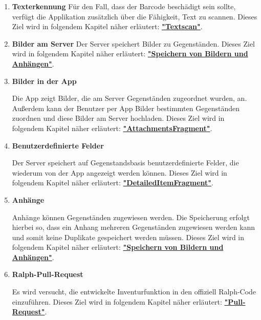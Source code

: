 \documentclass[
    headings=optiontotocandhead,%
    twoside,
    numbers=noenddot,%
    toc=flat, %
    12pt, %
    titlepage, %
    parskip=full, %
    listof=totoc, %
    listof=flat, %
    numbers=noenddot, %
    bibliography=totoc, %
    a4paper,DIV=14,
    BCOR=15mm,
]{scrbook}
\begin{document}
\begin{enumerate}
  \item \textbf{Texterkennung}
  Für den Fall, dass der Barcode beschädigt sein sollte, verfügt die Applikation zusätzlich über die Fähigkeit, Text zu scannen.  
  Dieses Ziel wird in folgendem Kapitel näher erläutert: \textbf{\href{textscan}{"Textscan"}}.




  \item \textbf{Bilder am Server}
  Der Server speichert Bilder zu Gegenständen.  
  Dieses Ziel wird in folgendem Kapitel näher erläutert: \textbf{\href{speichern-von-bildern-und-anhuxe4ngen}{"Speichern von Bildern und Anhängen"}}.



  \item \textbf{Bilder in der App}

  Die App zeigt Bilder, die am Server Gegenständen zugeordnet wurden, an. Außerdem kann der Benutzer per App Bilder bestimmten Gegenständen zuordnen und diese Bilder am Server hochladen.
  Dieses Ziel wird in folgendem Kapitel näher erläutert: \textbf{\href{attachmentsfragment}{"AttachmentsFragment"}}.




  \item \textbf{Benutzerdefinierte Felder}

  Der Server speichert auf Gegenstandsbasis benutzerdefinierte Felder, die wiederum von der App angezeigt werden können.
  Dieses Ziel wird in folgendem Kapitel näher erläutert: \textbf{\href{detaileditemfragment}{"DetailedItemFragment"}}.



  \item \textbf{Anhänge}

  Anhänge können Gegenständen zugewiesen werden. Die Speicherung erfolgt hierbei so, dass ein Anhang mehreren Gegenständen zugewiesen werden kann und somit keine Duplikate gespeichert werden müssen.
  Dieses Ziel wird in folgendem Kapitel näher erläutert: \textbf{\href{speichern-von-bildern-und-anhuxe4ngen}{"Speichern von Bildern und Anhängen"}}.



  \item \textbf{Ralph-Pull-Request}

  Es wird versucht, die entwickelte Inventurfunktion in den offiziell Ralph-Code einzuführen. 
  Dieses Ziel wird in folgendem Kapitel näher erläutert: \textbf{\href{pull-request}{"Pull-Request"}}.




\end{enumerate}
\end{document}
